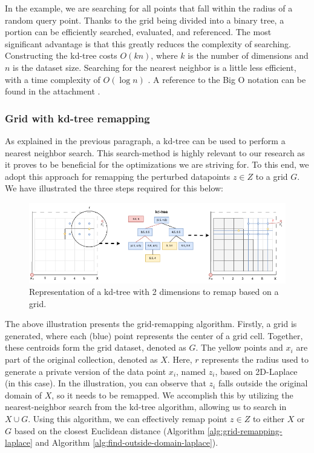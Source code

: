 In the example, we are searching for all points that fall within the radius of a random query point.
Thanks to the grid being divided into a binary tree, a portion can be efficiently searched, evaluated, and referenced.
The most significant advantage is that this greatly reduces the complexity of searching.
Constructing the kd-tree costs $O(kn)$, where $k$ is the number of dimensions and $n$ is the dataset size.
Searching for the nearest neighbor is a little less efficient, with a time complexity of $O(\log n)$ \citep{washington_k-d_2002}.
A reference to the Big O notation can be found in the attachment .
\subsubsection{Grid with kd-tree remapping} \label{theory:grid-remapping}
As explained in the previous paragraph, a kd-tree can be used to perform a nearest neighbor search.
This search-method is highly relevant to our research as it proves to be beneficial for the optimizations we are striving for.
To this end, we adopt this approach for remapping the perturbed datapoints $z \in Z$ to a grid $G$. \newline
We have illustrated the three steps required for this below:
\begin{figure}[H]
  \includegraphics[width=1\textwidth]{TheorethicalFramework/ND-Laplace/Images/KD-tree.png}
  \caption{Representation of a kd-tree with 2 dimensions to remap based on a grid.}
  \label{fig:kd-tree}
\end{figure}
The above illustration presents the grid-remapping algorithm.
Firstly, a grid is generated, where each (blue) point represents the center of a grid cell.
Together, these centroids form the grid dataset, denoted as $G$.
The yellow points and $x_i$ are part of the original collection, denoted as $X$.
Here, $r$ represents the radius used to generate a private version of the data point $x_i$, named $z_i$, based on 2D-Laplace (in this case).
In the illustration, you can observe that $z_i$ falls outside the original domain of $X$, so it needs to be remapped.
We accomplish this by utilizing the nearest-neighbor search from the kd-tree algorithm, allowing us to search in $X \cup G$.
Using this algorithm, we can effectively remap point $z \in Z$ to either $X$ or $G$ based on the closest Euclidean distance (Algorithm \ref{alg:grid-remapping-laplace} and Algorithm \ref{alg:find-outside-domain-laplace}).

